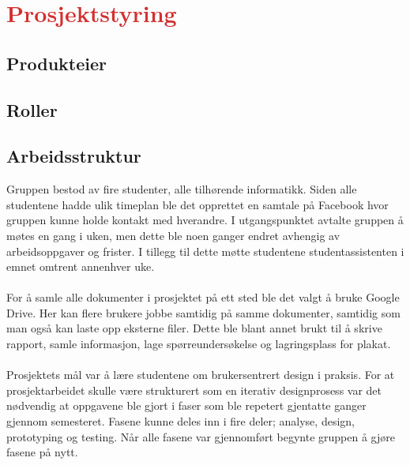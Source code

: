 \section{\textcolor[HTML]{D32F2F}{Prosjektstyring}}

\subsection{Produkteier}

\subsection{Roller}

\subsection{Arbeidsstruktur}
Gruppen bestod av fire studenter, alle tilhørende informatikk. Siden alle studentene hadde ulik timeplan ble det opprettet en samtale på Facebook hvor gruppen kunne holde kontakt med hverandre. I utgangspunktet avtalte gruppen å møtes en gang i uken, men dette ble noen ganger endret avhengig av arbeidsoppgaver og frister. I tillegg til dette møtte studentene studentassistenten i emnet omtrent annenhver uke. 
\\\\
For å samle alle dokumenter i prosjektet på ett sted ble det valgt å bruke Google Drive. Her kan flere brukere jobbe samtidig på samme dokumenter, samtidig som man også kan laste opp eksterne filer. Dette ble blant annet brukt til å skrive rapport, samle informasjon, lage spørreundersøkelse og lagringsplass for plakat. 
\\\\
Prosjektets mål var å lære studentene om brukersentrert design i praksis. For at prosjektarbeidet skulle være strukturert som en iterativ designprosess var det nødvendig at oppgavene ble gjort i faser som ble repetert gjentatte ganger gjennom semesteret. Fasene kunne deles inn i fire deler; analyse, design, prototyping og testing. Når alle fasene var gjennomført begynte gruppen å gjøre fasene på nytt. 